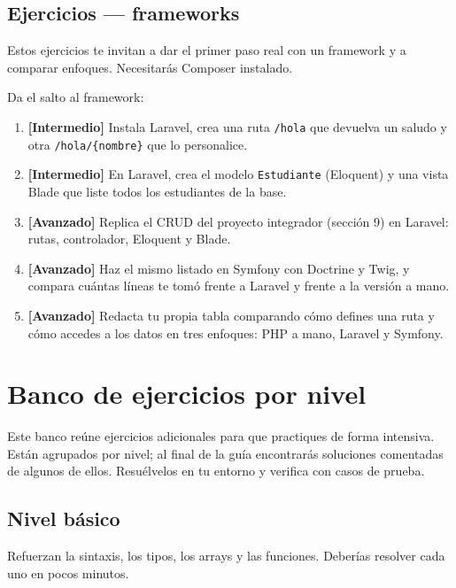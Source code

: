 \documentclass[11pt]{article}
\begin{document}
\subsection{Ejercicios — frameworks}
Estos ejercicios te invitan a dar el primer paso real con un framework y a comparar enfoques. Necesitarás Composer instalado.

Da el salto al framework:

\begin{enumerate}[leftmargin=1.7em,itemsep=3pt,topsep=2pt]
\item \textbf{[Intermedio]} Instala Laravel, crea una ruta \texttt{/\allowbreak{}hola} que devuelva un saludo y otra \texttt{/\allowbreak{}hola/\allowbreak{}\{nombre\}} que lo personalice.
\item \textbf{[Intermedio]} En Laravel, crea el modelo \texttt{Estudiante} (Eloquent) y una vista Blade que liste todos los estudiantes de la base.
\item \textbf{[Avanzado]} Replica el CRUD del proyecto integrador (sección 9) en Laravel: rutas, controlador, Eloquent y Blade.
\item \textbf{[Avanzado]} Haz el mismo listado en Symfony con Doctrine y Twig, y compara cuántas líneas te tomó frente a Laravel y frente a la versión a mano.
\item \textbf{[Avanzado]} Redacta tu propia tabla comparando cómo defines una ruta y cómo accedes a los datos en tres enfoques: PHP a mano, Laravel y Symfony.
\end{enumerate}
\section{Banco de ejercicios por nivel}
Este banco reúne ejercicios adicionales para que practiques de forma intensiva. Están agrupados por nivel; al final de la guía encontrarás soluciones comentadas de algunos de ellos. Resuélvelos en tu entorno y verifica con casos de prueba.

\subsection{Nivel básico}
Refuerzan la sintaxis, los tipos, los arrays y las funciones. Deberías resolver cada uno en pocos minutos.
\end{document}
